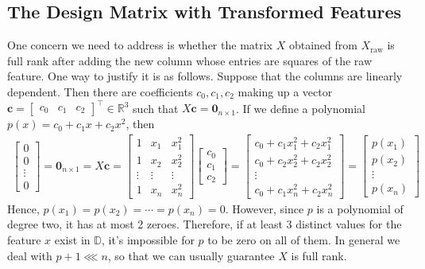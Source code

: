 \documentclass[12pt, a4paper]{article}
\theoremstyle{definition}
\begin{document}
	\subsection*{The Design Matrix with Transformed Features}
	One concern we need to address is whether the matrix $X$ obtained from
	$X_{\text{raw}}$ is full rank after adding the new column whose entries
	are squares of the raw feature. One way to justify it is as follows.
	Suppose that the columns are linearly dependent. Then there are coefficients
	$c_0,c_1,c_2$ making up a vector $\bm{c}=\begin{bmatrix}
		c_0 & c_1 & c_2
	\end{bmatrix}^\top\in\mathbb{R}^3$
	such that $X\bm{c}=\bm{0}_{n \times 1}$. If we define a polynomial $p(x)=c_0+c_1x+c_2x^2$,
	then
	\begin{align*}
		\begin{bmatrix}
			0\\
			0\\
			\vdots\\
			0
		\end{bmatrix}
		=
		\bm{0}_{n\times 1}
		=
		X\bm{c}
		=
		\begin{bmatrix}
			1 & x_1 & x_1^2\\
			1 & x_2 & x_2^2\\
			\vdots & \vdots & \vdots\\
			1 & x_n & x_n^2
		\end{bmatrix}
		\begin{bmatrix}
			c_0\\
			c_1\\
			c_2
		\end{bmatrix}
		=\begin{bmatrix}
			c_0 + c_1x_1^2 + c_2x_1^2\\
			c_0 + c_2x_2^2 + c_2x_2^2\\
			\vdots\\
			c_0 + c_1x_n^2 + c_2x_n^2
		\end{bmatrix}
		=\begin{bmatrix}
			p(x_1)\\
			p(x_2)\\
			\vdots\\
			p(x_n)
		\end{bmatrix}
	\end{align*}
	Hence, $p(x_1)=p(x_2)=\cdots=p(x_n)=0$. However, since $p$ is a polynomial of degree
	two, it has at most 2 zeroes. Therefore, if at least $3$ distinct values for the feature
	$x$ exist in $\mathbb{D}$, it's impossible for $p$ to be zero on all of them.
	In general we deal with $p + 1 \lll n$, so that we can usually guarantee
	$X$ is full rank.
	
\end{document}
